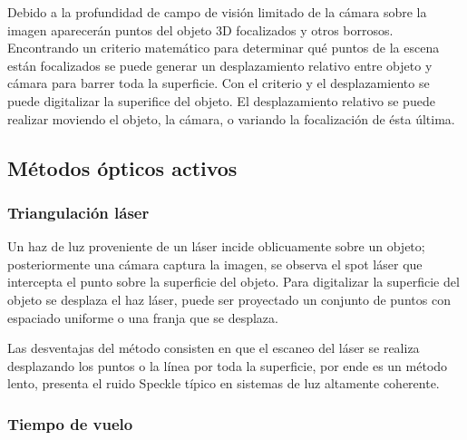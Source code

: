 \documentclass[UTF8]{article}
\begin{document}
Debido a la profundidad de campo de visión limitado de la cámara sobre la imagen aparecerán puntos del objeto 3D focalizados y otros borrosos. Encontrando un criterio matemático para determinar qué puntos de la escena están focalizados se puede generar un desplazamiento relativo entre objeto y cámara para barrer toda la superficie. Con el criterio y el desplazamiento se puede digitalizar la superifice del objeto. El desplazamiento relativo se puede realizar moviendo el objeto, la cámara, o variando la focalización de ésta última.
%
\medskip


\subsection{Métodos ópticos activos}

\subsubsection{Triangulación láser}

Un haz de luz proveniente de un láser incide oblicuamente sobre un objeto; posteriormente una cámara captura la imagen, se observa el spot láser que intercepta el punto sobre la superficie del objeto. Para digitalizar la superficie del objeto se desplaza el haz láser, puede ser proyectado un conjunto de puntos con espaciado uniforme o una franja que se desplaza.

Las desventajas del método consisten en que el escaneo del láser se realiza desplazando los puntos o la línea por toda la superficie, por ende es un método lento,  presenta el ruido Speckle típico en sistemas de luz altamente coherente.
\medskip


\subsubsection{Tiempo de vuelo}
\end{document}
